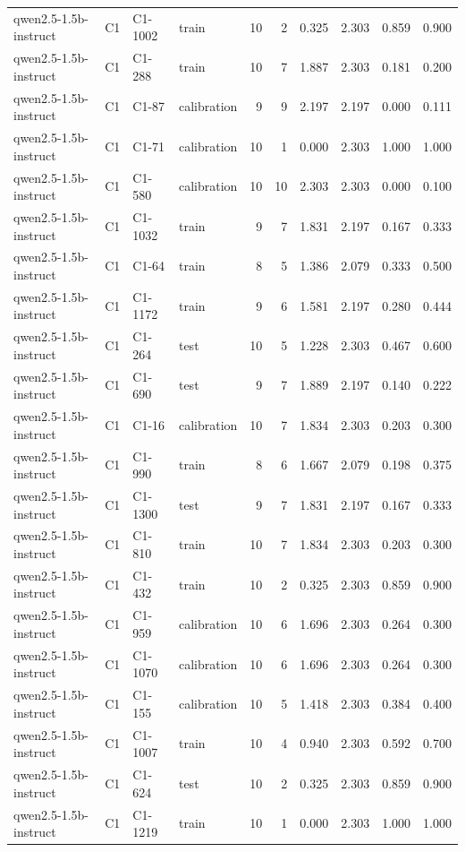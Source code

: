 \begin{table}
\begin{tabular}{llllrrrrrr}
qwen2.5-1.5b-instruct & C1 & C1-1002 & train & 10 & 2 & 0.325 & 2.303 & 0.859 & 0.900 \\
qwen2.5-1.5b-instruct & C1 & C1-288 & train & 10 & 7 & 1.887 & 2.303 & 0.181 & 0.200 \\
qwen2.5-1.5b-instruct & C1 & C1-87 & calibration & 9 & 9 & 2.197 & 2.197 & 0.000 & 0.111 \\
qwen2.5-1.5b-instruct & C1 & C1-71 & calibration & 10 & 1 & 0.000 & 2.303 & 1.000 & 1.000 \\
qwen2.5-1.5b-instruct & C1 & C1-580 & calibration & 10 & 10 & 2.303 & 2.303 & 0.000 & 0.100 \\
qwen2.5-1.5b-instruct & C1 & C1-1032 & train & 9 & 7 & 1.831 & 2.197 & 0.167 & 0.333 \\
qwen2.5-1.5b-instruct & C1 & C1-64 & train & 8 & 5 & 1.386 & 2.079 & 0.333 & 0.500 \\
qwen2.5-1.5b-instruct & C1 & C1-1172 & train & 9 & 6 & 1.581 & 2.197 & 0.280 & 0.444 \\
qwen2.5-1.5b-instruct & C1 & C1-264 & test & 10 & 5 & 1.228 & 2.303 & 0.467 & 0.600 \\
qwen2.5-1.5b-instruct & C1 & C1-690 & test & 9 & 7 & 1.889 & 2.197 & 0.140 & 0.222 \\
qwen2.5-1.5b-instruct & C1 & C1-16 & calibration & 10 & 7 & 1.834 & 2.303 & 0.203 & 0.300 \\
qwen2.5-1.5b-instruct & C1 & C1-990 & train & 8 & 6 & 1.667 & 2.079 & 0.198 & 0.375 \\
qwen2.5-1.5b-instruct & C1 & C1-1300 & test & 9 & 7 & 1.831 & 2.197 & 0.167 & 0.333 \\
qwen2.5-1.5b-instruct & C1 & C1-810 & train & 10 & 7 & 1.834 & 2.303 & 0.203 & 0.300 \\
qwen2.5-1.5b-instruct & C1 & C1-432 & train & 10 & 2 & 0.325 & 2.303 & 0.859 & 0.900 \\
qwen2.5-1.5b-instruct & C1 & C1-959 & calibration & 10 & 6 & 1.696 & 2.303 & 0.264 & 0.300 \\
qwen2.5-1.5b-instruct & C1 & C1-1070 & calibration & 10 & 6 & 1.696 & 2.303 & 0.264 & 0.300 \\
qwen2.5-1.5b-instruct & C1 & C1-155 & calibration & 10 & 5 & 1.418 & 2.303 & 0.384 & 0.400 \\
qwen2.5-1.5b-instruct & C1 & C1-1007 & train & 10 & 4 & 0.940 & 2.303 & 0.592 & 0.700 \\
qwen2.5-1.5b-instruct & C1 & C1-624 & test & 10 & 2 & 0.325 & 2.303 & 0.859 & 0.900 \\
qwen2.5-1.5b-instruct & C1 & C1-1219 & train & 10 & 1 & 0.000 & 2.303 & 1.000 & 1.000 \\

\end{tabular}
\end{table}
